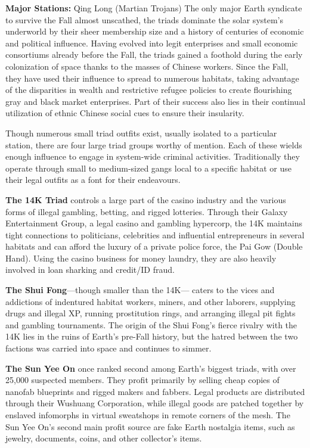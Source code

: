 \textbf{Major Stations: }Qing Long (Martian Trojans)
The only major Earth syndicate to survive the Fall 
almost unscathed, the triads dominate the solar 
system's underworld by their sheer membership size 
and a history of centuries of economic and political 
influence. Having evolved into legit enterprises and 
small economic consortiums already before the Fall, 
the triads gained a foothold during the early colonization of space thanks to the masses of Chinese workers. 
Since the Fall, they have used their influence to spread 
to numerous habitats, taking advantage of the disparities in wealth and restrictive refugee policies to create 
flourishing gray and black market enterprises. Part of 
their success also lies in their continual utilization of 
ethnic Chinese social cues to ensure their insularity.

Though numerous small triad outfits exist, usually 
isolated to a particular station, there are four large 
triad groups worthy of mention. Each of these wields 
enough influence to engage in system-wide criminal 
activities. Traditionally they operate through small to 
medium-sized gangs local to a specific habitat or use 
their legal outfits as a font for their endeavours.

\textbf{The 14K Triad} controls a large part of the casino 
industry and the various forms of illegal gambling, 
betting, and rigged lotteries. Through their Galaxy 
Entertainment Group, a legal casino and gambling 
hypercorp, the 14K maintains tight connections to 
politicians, celebrities and influential entrepreneurs in 
several habitats and can afford the luxury of a private 
police force, the Pai Gow (Double Hand). Using the 
casino business for money laundry, they are also heavily involved in loan sharking and credit/ID fraud.

\textbf{The Shui Fong}—though smaller than the 14K—
caters to the vices and addictions of indentured 
habitat workers, miners, and other laborers, supplying 
drugs and illegal XP, running prostitution rings, and 
arranging illegal pit fights and gambling tournaments. 
The origin of the Shui Fong's fierce rivalry with the 
14K lies in the ruins of Earth's pre-Fall history, but 
the hatred between the two factions was carried into 
space and continues to simmer.

\textbf{The Sun Yee On} once ranked second among Earth's 
biggest triads, with over 25,000 suspected members. 
They profit primarily by selling cheap copies of nanofab blueprints and rigged makers and fabbers. Legal 
products are distributed through their Wushuang Corporation, while illegal goods are patched together by 
enslaved infomorphs in virtual sweatshops in remote 
corners of the mesh. The Sun Yee On's second main 
profit source are fake Earth nostalgia items, such as 
jewelry, documents, coins, and other collector's items.

